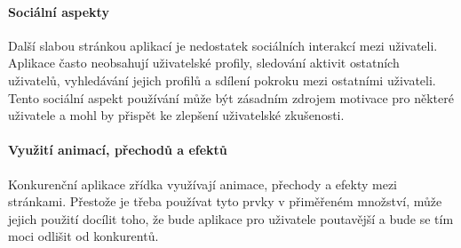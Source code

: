 \paragraph{Sociální aspekty}

Další slabou stránkou aplikací je nedostatek sociálních interakcí mezi uživateli. Aplikace často neobsahují uživatelské profily, sledování aktivit ostatních uživatelů, vyhledávání jejich profilů a sdílení pokroku mezi ostatními uživateli. Tento sociální aspekt používání může být zásadním zdrojem motivace pro některé uživatele a mohl by přispět ke zlepšení uživatelské zkušenosti.

\paragraph{Využití animací, přechodů a efektů}

Konkurenční aplikace zřídka využívají animace, přechody a efekty mezi stránkami. Přestože je třeba používat tyto prvky v přiměřeném množství, může jejich použití docílit toho, že bude aplikace pro uživatele poutavější a bude se tím moci odlišit od konkurentů.
